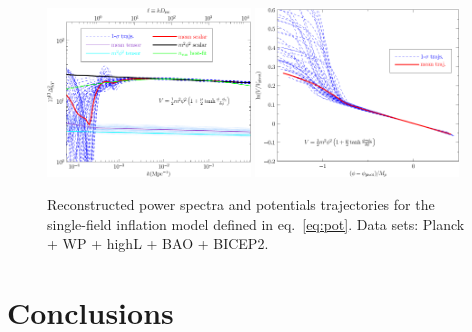 \documentclass[a4paper,11pt]{article}
\def \halffigwidth{0.48\textwidth}
\begin{document}
\begin{figure}
\includegraphics[width=\halffigwidth]{bump_power_trajs.pdf}%
\includegraphics[width=\halffigwidth]{bump_potential_trajs.pdf}
\caption{Reconstructed power spectra and potentials trajectories for the single-field inflation model defined in eq.~\eqref{eq:pot}. Data sets: Planck + WP + highL + BAO + BICEP2. \label{fig:traj_model}}
\end{figure}

\section{Conclusions}
\end{document}
